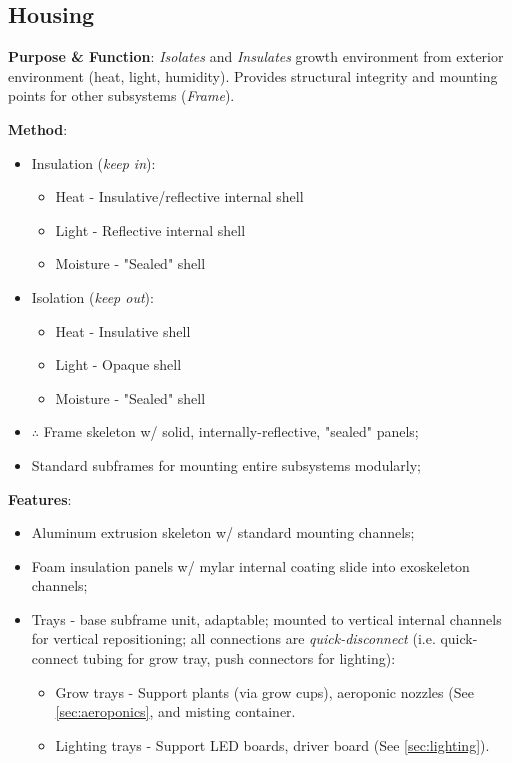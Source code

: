 \documentclass{report}
\begin{document}
\newpage

\subsection{Housing}
\label{sec:housing}

\textbf{Purpose \& Function}: \textit{Isolates} and \textit{Insulates} growth environment from exterior environment (heat, light, humidity). Provides structural integrity and mounting points for other subsystems (\textit{Frame}).

\textbf{Method}:
\begin{itemize}
    \item Insulation (\textit{keep in}):
    \begin{itemize}
        \item Heat - Insulative/reflective internal shell
        \item Light - Reflective internal shell
        \item Moisture - "Sealed" shell
    \end{itemize}
    \item Isolation (\textit{keep out}):
    \begin{itemize}
        \item Heat - Insulative shell
        \item Light - Opaque shell
        \item Moisture - "Sealed" shell
    \end{itemize}
    \item $\therefore$ Frame skeleton w/ solid, internally-reflective, "sealed" panels;
    \item Standard subframes for mounting entire subsystems modularly;
\end{itemize}

\textbf{Features}:
\begin{itemize}
    \item Aluminum extrusion skeleton w/ standard mounting channels;
    \item Foam insulation panels w/ mylar internal coating slide into exoskeleton channels;
    \item Trays - base subframe unit, adaptable; mounted to vertical internal channels for vertical repositioning; all connections are \textit{quick-disconnect} (i.e. quick-connect tubing for grow tray, push connectors for lighting):
    \begin{itemize}
        \item Grow trays - Support plants (via grow cups), aeroponic nozzles (See \ref{sec:aeroponics}, and misting container.
        \item Lighting trays - Support LED boards, driver board (See \ref{sec:lighting}).
    \end{itemize}
\end{itemize}
\end{document}
